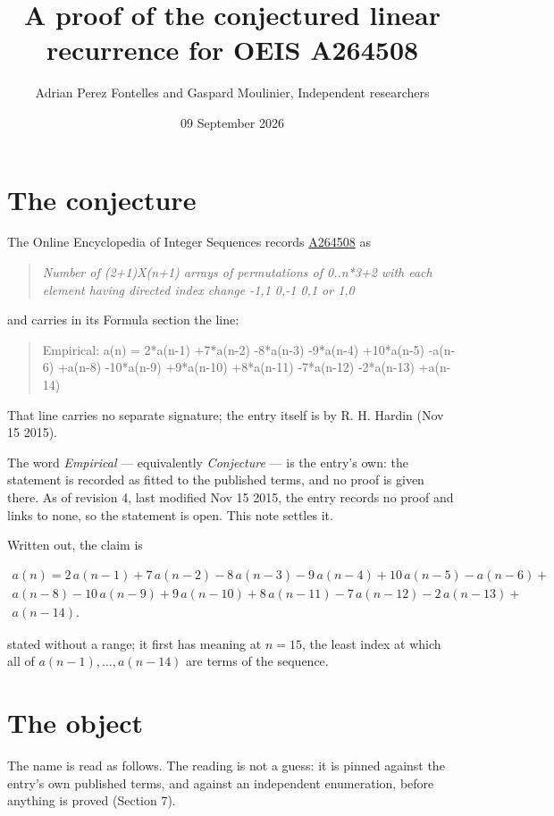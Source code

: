 \documentclass[11pt]{article}
\title{A proof of the conjectured linear recurrence for OEIS A264508}
\author{Adrian Perez Fontelles and Gaspard Moulinier, Independent researchers}
\date{09 September 2026}
\theoremstyle{definition}
\begin{document}
\maketitle
\section{The conjecture}

The Online Encyclopedia of Integer Sequences records \href{https://oeis.org/A264508}{A264508} as

\begin{quote}\itshape Number of (2+1)X(n+1) arrays of permutations of 0..n*3+2 with each element having directed index change -1,1 0,-1 0,1 or 1,0\end{quote}

and carries in its Formula section the line:

\begin{quote}\ttfamily Empirical: a(n) = 2*a(n-1) +7*a(n-2) -8*a(n-3) -9*a(n-4) +10*a(n-5) -a(n-6) +a(n-8) -10*a(n-9) +9*a(n-10) +8*a(n-11) -7*a(n-12) -2*a(n-13) +a(n-14)\end{quote}

That line carries no separate signature; the entry itself is by R. H. Hardin (Nov 15 2015).

The word {\itshape Empirical} --- equivalently {\itshape Conjecture} --- is the entry's own: the statement is recorded as fitted to the published terms, and no proof is given there. As of revision 4, last modified Nov 15 2015, the entry records no proof and links to none, so the statement is open. This note settles it.

Written out, the claim is

\begin{multline*} a(n) = 2\,a(n-1) + 7\,a(n-2) - 8\,a(n-3) - 9\,a(n-4) + 10\,a(n-5) - a(n-6) + \\ a(n-8) - 10\,a(n-9) + 9\,a(n-10) + 8\,a(n-11) - 7\,a(n-12) - 2\,a(n-13) + \\ a(n-14). \end{multline*}

stated without a range; it first has meaning at $n = 15$, the least index at which all of $a(n-1),\dots,a(n-14)$ are terms of the sequence.

\section{The object}

The name is read as follows. The reading is not a guess: it is pinned against the entry's own published terms, and against an independent enumeration, before anything is proved (Section 7).
\end{document}
